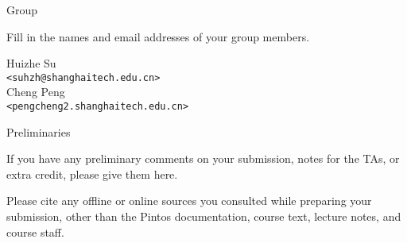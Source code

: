 


\begin{titlepage} %

  \begin{center}
  \end{center}
  \vfill %

  \begin{aspect}{Group}
    \begin{tcolorbox}
      \large
      Fill in the names and email addresses of your group members.
    \end{tcolorbox}
    \centering
    \large
    \vspace{0.1cm}
    Huizhe Su\\
    \texttt{<suhzh@shanghaitech.edu.cn>}\\
    Cheng Peng\\
    \texttt{<pengcheng2.shanghaitech.edu.cn>}
  \end{aspect}

  \begin{aspect}{Preliminaries}
    \begin{tcolorbox}
      If you have any preliminary comments on your submission, notes for the
      TAs, or extra credit, please give them here.

      Please cite any offline or online sources you consulted while
      preparing your submission, other than the Pintos documentation, course
      text, lecture notes, and course staff.
    \end{tcolorbox}
  \end{aspect}

\end{titlepage}
